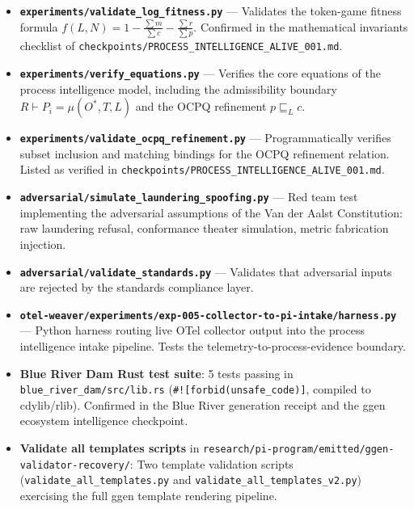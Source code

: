 \begin{itemize}
  \item \textbf{\texttt{experiments/validate\_log\_fitness.py}} --- Validates the token-game
    fitness formula $f(L, N) = 1 - \frac{\sum m}{\sum c} - \frac{\sum r}{\sum p}$.
    Confirmed in the mathematical invariants checklist of
    \texttt{checkpoints/PROCESS\_INTELLIGENCE\_ALIVE\_001.md}.

  \item \textbf{\texttt{experiments/verify\_equations.py}} --- Verifies the core equations
    of the process intelligence model, including the admissibility boundary
    $R \vdash P_i = \mu(O^*, T, L)$ and the OCPQ refinement $p \sqsubseteq_L c$.

  \item \textbf{\texttt{experiments/validate\_ocpq\_refinement.py}} --- Programmatically
    verifies subset inclusion and matching bindings for the OCPQ refinement relation.
    Listed as verified in \texttt{checkpoints/PROCESS\_INTELLIGENCE\_ALIVE\_001.md}.

  \item \textbf{\texttt{adversarial/simulate\_laundering\_spoofing.py}} --- Red team test
    implementing the adversarial assumptions of the Van der Aalst Constitution: raw laundering
    refusal, conformance theater simulation, metric fabrication injection.

  \item \textbf{\texttt{adversarial/validate\_standards.py}} --- Validates that adversarial
    inputs are rejected by the standards compliance layer.

  \item \textbf{\texttt{otel-weaver/experiments/exp-005-collector-to-pi-intake/harness.py}}
    --- Python harness routing live OTel collector output into the process intelligence intake
    pipeline. Tests the telemetry-to-process-evidence boundary.

  \item \textbf{Blue River Dam Rust test suite}: 5 tests passing in
    \texttt{blue\_river\_dam/src/lib.rs} (\texttt{\#![forbid(unsafe\_code)]}, compiled to
    cdylib/rlib). Confirmed in the Blue River generation receipt and the ggen ecosystem
    intelligence checkpoint.

  \item \textbf{Validate all templates scripts} in
    \texttt{research/pi-program/emitted/ggen-validator-recovery/}: Two template validation
    scripts (\texttt{validate\_all\_templates.py} and \texttt{validate\_all\_templates\_v2.py})
    exercising the full ggen template rendering pipeline.
\end{itemize}


